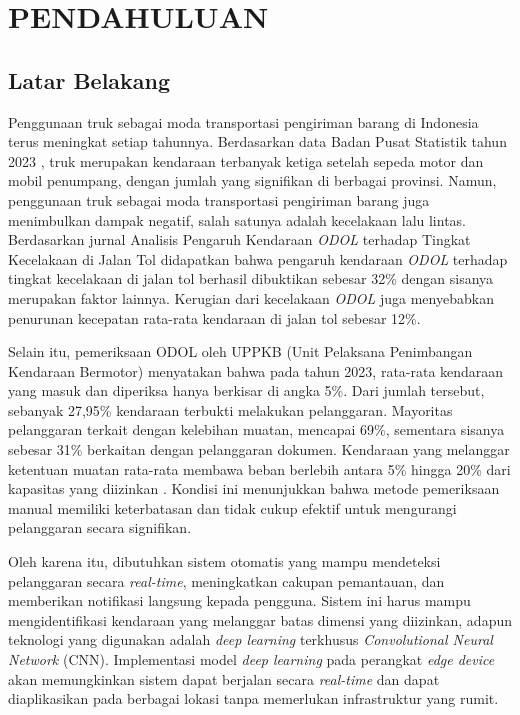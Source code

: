 \chapter{PENDAHULUAN}
\label{chap:pendahuluan}


\section{Latar Belakang}
\label{sec:latarbelakang}
Penggunaan truk sebagai moda transportasi pengiriman barang di Indonesia terus meningkat setiap tahunnya. Berdasarkan data Badan Pusat Statistik tahun 2023 \parencite*{bps2023}, truk merupakan kendaraan terbanyak ketiga setelah sepeda motor dan mobil penumpang, dengan jumlah yang signifikan di berbagai provinsi. Namun, penggunaan truk sebagai moda transportasi pengiriman barang juga menimbulkan dampak negatif, salah satunya adalah kecelakaan lalu lintas. Berdasarkan jurnal Analisis Pengaruh Kendaraan \emph{ODOL} terhadap Tingkat Kecelakaan di Jalan Tol \parencite*{odol2020} didapatkan bahwa pengaruh kendaraan \emph{ODOL} terhadap tingkat kecelakaan di jalan tol berhasil dibuktikan sebesar 32\% dengan sisanya merupakan faktor lainnya. Kerugian dari kecelakaan \emph{ODOL} juga menyebabkan penurunan kecepatan rata-rata kendaraan di jalan tol sebesar 12\%.

Selain itu, pemeriksaan ODOL oleh UPPKB (Unit Pelaksana Penimbangan Kendaraan Bermotor) menyatakan bahwa pada tahun 2023, rata-rata kendaraan yang masuk dan diperiksa hanya berkisar di angka 5\%. Dari jumlah tersebut, sebanyak 27,95\% kendaraan terbukti melakukan pelanggaran. Mayoritas pelanggaran terkait dengan kelebihan muatan, mencapai 69\%, sementara sisanya sebesar 31\% berkaitan dengan pelanggaran dokumen. Kendaraan yang melanggar ketentuan muatan rata-rata membawa beban berlebih antara 5\% hingga 20\% dari kapasitas yang diizinkan \parencite*{hubdat2024}. Kondisi ini menunjukkan bahwa metode pemeriksaan manual memiliki keterbatasan dan tidak cukup efektif untuk mengurangi pelanggaran secara signifikan.

Oleh karena itu, dibutuhkan sistem otomatis yang mampu mendeteksi pelanggaran secara \emph{real-time}, meningkatkan cakupan pemantauan, dan memberikan notifikasi langsung kepada pengguna. Sistem ini harus mampu mengidentifikasi kendaraan yang melanggar batas dimensi yang diizinkan, adapun teknologi yang digunakan adalah \emph{deep learning} terkhusus \emph{Convolutional Neural Network} (CNN). Implementasi model \emph{deep learning} pada perangkat \emph{edge device} akan memungkinkan sistem dapat berjalan secara \emph{real-time} dan dapat diaplikasikan pada berbagai lokasi tanpa memerlukan infrastruktur yang rumit.


